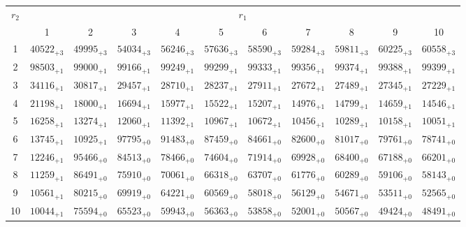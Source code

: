 \documentclass[10pt, a4paper]{article}
\begin{document}
\begin{center}
    \begin{tabular}{c || c c c c c | c c c c c}
        \multirow{2}{*}{\(r_2\)} & \multicolumn{10}{c}{\(r_1\)} \\
        & 1 & 2 & 3 & 4 & 5 & 6 & 7 & 8 & 9 & 10\\
        \hline\hline
        1 & \({40522}_{+3}\) & \({49995}_{+3}\) & \({54034}_{+3}\) & \({56246}_{+3}\) & \({57636}_{+3}\) & \({58590}_{+3}\) & \({59284}_{+3}\) & \({59811}_{+3}\) & \({60225}_{+3}\) & \({60558}_{+3}\)\\
        2 & \({98503}_{+1}\) & \({99000}_{+1}\) & \({99166}_{+1}\) & \({99249}_{+1}\) & \({99299}_{+1}\) & \({99333}_{+1}\) & \({99356}_{+1}\) & \({99374}_{+1}\) & \({99388}_{+1}\) & \({99399}_{+1}\)\\
        3 & \({34116}_{+1}\) & \({30817}_{+1}\) & \({29457}_{+1}\) & \({28710}_{+1}\) & \({28237}_{+1}\) & \({27911}_{+1}\) & \({27672}_{+1}\) & \({27489}_{+1}\) & \({27345}_{+1}\) & \({27229}_{+1}\)\\
        4 & \({21198}_{+1}\) & \({18000}_{+1}\) & \({16694}_{+1}\) & \({15977}_{+1}\) & \({15522}_{+1}\) & \({15207}_{+1}\) & \({14976}_{+1}\) & \({14799}_{+1}\) & \({14659}_{+1}\) & \({14546}_{+1}\)\\
        5 & \({16258}_{+1}\) & \({13274}_{+1}\) & \({12060}_{+1}\) & \({11392}_{+1}\) & \({10967}_{+1}\) & \({10672}_{+1}\) & \({10456}_{+1}\) & \({10289}_{+1}\) & \({10158}_{+1}\) & \({10051}_{+1}\)\\
        \hline
        6 & \({13745}_{+1}\) & \({10925}_{+1}\) & \({97795}_{+0}\) & \({91483}_{+0}\) & \({87459}_{+0}\) & \({84661}_{+0}\) & \({82600}_{+0}\) & \({81017}_{+0}\) & \({79761}_{+0}\) & \({78741}_{+0}\)\\
        7 & \({12246}_{+1}\) & \({95466}_{+0}\) & \({84513}_{+0}\) & \({78466}_{+0}\) & \({74604}_{+0}\) & \({71914}_{+0}\) & \({69928}_{+0}\) & \({68400}_{+0}\) & \({67188}_{+0}\) & \({66201}_{+0}\)\\
        8 & \({11259}_{+1}\) & \({86491}_{+0}\) & \({75910}_{+0}\) & \({70061}_{+0}\) & \({66318}_{+0}\) & \({63707}_{+0}\) & \({61776}_{+0}\) & \({60289}_{+0}\) & \({59106}_{+0}\) & \({58143}_{+0}\)\\
        9 & \({10561}_{+1}\) & \({80215}_{+0}\) & \({69919}_{+0}\) & \({64221}_{+0}\) & \({60569}_{+0}\) & \({58018}_{+0}\) & \({56129}_{+0}\) & \({54671}_{+0}\) & \({53511}_{+0}\) & \({52565}_{+0}\)\\
        10 & \({10044}_{+1}\) & \({75594}_{+0}\) & \({65523}_{+0}\) & \({59943}_{+0}\) & \({56363}_{+0}\) & \({53858}_{+0}\) & \({52001}_{+0}\) & \({50567}_{+0}\) & \({49424}_{+0}\) & \({48491}_{+0}\)\\

\end{tabular}
\end{center}
\end{document}
